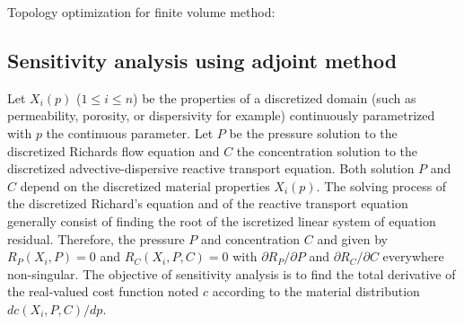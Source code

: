 \documentclass[11pt]{article}
\begin{document}
Topology optimization for finite volume method: 



\subsection{Sensitivity analysis using adjoint method}

Let $X_i(p)$ ($1 \leq i \leq n$) be the properties of a discretized domain (such as permeability, porosity, or dispersivity for example) continuously parametrized with $p$ the continuous parameter.
Let $P$ be the pressure solution to the discretized Richards flow equation and $C$ the concentration solution to the discretized advective-dispersive reactive transport equation. Both solution $P$ and $C$ depend on the discretized material properties $X_i(p)$.
The solving process of the discretized Richard's equation and of the reactive transport equation generally consist of finding the root of the iscretized linear system of equation residual. Therefore, the pressure $P$ and concentration $C$ and given by $R_P(X_i, P)=0$ and $R_C(X_i, P, C)=0$ with $\partial R_P / \partial P$ and $\partial R_C / \partial C$ everywhere non-singular.
The objective of sensitivity analysis is to find the total derivative of the real-valued cost function noted $c$ according to the material distribution $dc\left(X_i, P, C\right) / dp$.
\end{document}
